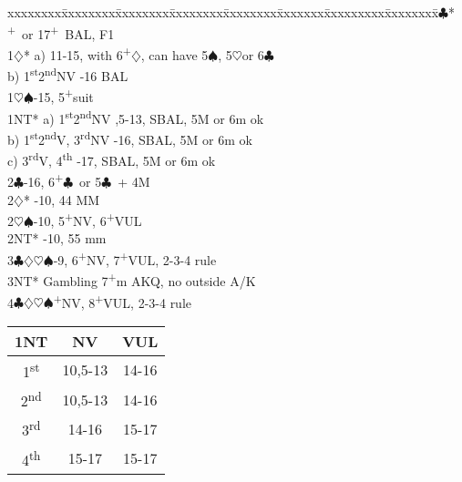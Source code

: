 \documentclass[10pt]{article}
\renewcommand{\c}{$\clubsuit$}
\renewcommand{\d}{$\diamondsuit$}
\newcommand{\h}{$\heartsuit$}
\newcommand{\s}{$\spadesuit$}
\newcommand{\p}{\textsuperscript{+}}
\newcommand{\sth}{1\textsuperscript{st}}
\newcommand{\ndh}{2\textsuperscript{nd}}
\newcommand{\rdh}{3\textsuperscript{rd}}
\newcommand{\thh}{4\textsuperscript{th}}
\newenvironment{bidtable}[1][]
{\textbf{#1}
  \begin{adjustwidth}{1em}{}
    \addvspace{2pt}
    \begin{tabbing}
      xxxxxxxx\=xxxxxxxx\=xxxxxxxx\=xxxxxxxx\=xxxxxxxx\=xxxxxxx\=xxxxxxxxx\=xxxxxxxx\=\kill}
{\end{tabbing}\end{adjustwidth}\bigskip}%
\begin{document}
\begin{bidtable}
1\c*       {}\p\ or 17\p\ BAL, F1                                    \\
1\d*       \> a) 11-15, with 6\p\d, can have 5\s, 5\h or 6\c             \\
           \> b) \sth \ndh NV         \>  -16 BAL                  \\
1\h\s      {}-15, 5\p suit                                           \\
1NT*       \> a) \sth \ndh NV         \>  ,5-13, SBAL, 5M or 6m ok \\
           \> b) \sth \ndh V, \rdh NV \>  -16, SBAL, 5M or 6m ok   \\
           \> c) \rdh V, \thh         \>  -17, SBAL, 5M or 6m ok   \\
2\c        {}-16, 6\p\c\ or 5\c\ + 4M                                \\
2\d*       {}-10, 44 MM                                               \\
2\h\s      {}-10, 5\p NV, 6\p VUL                                     \\
2NT*       -10, 55 mm                                               \\
3\c\d\h\s  {}-9, 6\p NV, 7\p VUL, 2-3-4 rule                                      \\
3NT*       \> Gambling 7\p m AKQ, no outside A/K\\
4\c\d\h\s  {}\p NV, 8\p VUL, 2-3-4 rule
\end{bidtable}

\begin{tabular}{c|c|c}
  1NT & NV      & VUL   \\
  \hline
  \sth & 10,5-13 & 14-16 \\
  \ndh & 10,5-13 & 14-16 \\
  \rdh & 14-16   & 15-17 \\
  \thh & 15-17   & 15-17
\end{tabular}

\end{document}
